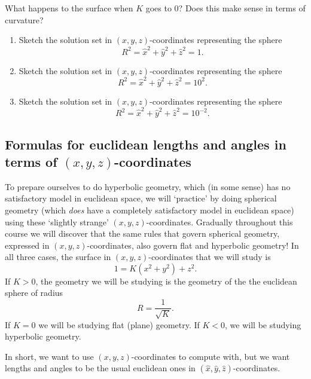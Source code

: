 \documentclass{ximera}
\begin{document}
\begin{problem}
  What happens to the surface when $K$ goes to $0$? Does this make
  sense in terms of curvature?
\end{problem}

\begin{problem}\hfil
\begin{enumerate}
\item Sketch the solution set in $\left(  x,y,z\right)  $-coordinates
representing the sphere%
\[
R^{2}=\hat{x}^{2}+\hat{y}^{2}+\hat{z}^{2}=1.
\]

\item Sketch the solution set in $\left(  x,y,z\right)  $-coordinates
representing the sphere%
\[
R^{2}=\hat{x}^{2}+\hat{y}^{2}+\hat{z}^{2}=10^{2}.
\]

\item Sketch the solution set in $\left(  x,y,z\right)  $-coordinates
representing the sphere%
\[
R^{2}=\hat{x}^{2}+\hat{y}^{2}+\hat{z}^{2}=10^{-2}.
\]
\end{enumerate}
\end{problem}

\subsection*{Formulas for euclidean lengths and angles in terms
of $\left(  x,y,z\right)  $-coordinates}

To prepare ourselves to do hyperbolic geometry, which (in some sense)
has no satisfactory model in euclidean space, we will `practice' by
doing spherical geometry (which \textit{does} have a completely
satisfactory model in euclidean space) using these `slightly strange'
$\left( x,y,z\right) $-coordinates. Gradually throughout this course
we will discover that the same rules that govern spherical geometry,
expressed in $\left( x,y,z\right) $-coordinates, also govern flat and
hyperbolic geometry! In all three cases, the surface in $\left(
x,y,z\right) $-coordinates that we will study is%
\[
1=K(x^{2}+y^{2})+z^{2}.
\]
If $K>0$, the geometry we will be studying is the geometry of the the
euclidean sphere of radius%
\[
R=\frac{1}{\sqrt{K}}.
\]
If $K=0$ we will be studying flat (plane) geometry. If $K<0$, we will be
studying hyperbolic geometry. 

In short, we want to use $\left(  x,y,z\right)  $-coordinates to compute with,
but we want lengths and angles to be the usual euclidean ones in $\left(
\hat{x},\hat{y},\hat{z}\right)  $-coordinates.
\end{document}
